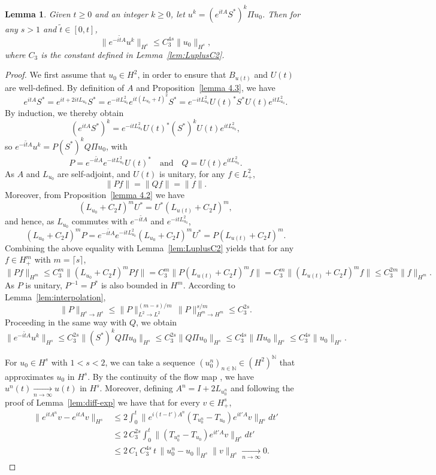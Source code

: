 \documentclass [11pt] {article}
\newtheorem{lem}[thm]{Lemma}
\begin{document}
\begin{lem}
\label{lem:Hs-bound}
Given $t\geq 0$ and an integer $k\geq 0$, let $u^k=(e^{itA}S^*)^k \Pi u_0$. Then for any $s>1$ and $\tilde t\in [0,t]$,
\[
\|e^{-i\tilde t A}u^k\|_{H^s} \leq C_3^{4s}\|u_0\|_{H^s},
\]
where $C_3$ is the constant defined in Lemma~\ref{lem:LuplusC2}.
\end{lem}
\begin{proof}
We first assume that $u_0\in H^2$, in order to ensure that $B_{u(t)}$ and $U(t)$ are well-defined.
By definition of $A$ and Proposition~\ref{lemma 4.3}, we have
\[
e^{itA}S^*=e^{it+2itL_{u_0}}S^*= e^{-i t L_{u_0}^2} e^{i t\left(L_{u_0}+I\right)^2} S^* = e^{-i t L_{u_0}^2} U(t)^*S^*U(t) e^{i t L_{u_0}^2}.
\]
By induction, we thereby obtain
\[
(e^{itA}S^*)^k=e^{-i t L_{u_0}^2} U(t)^* (S^*)^k U(t) e^{i t L_{u_0}^2},
\]
so $e^{-i\tilde tA}u^k=P(S^*)^kQ\Pi u_0$, with
\[
P=e^{-i\tilde t A}e^{-i t L_{u_0}^2} U(t)^*\quad\text{and}\quad Q=U(t) e^{i t L_{u_0}^2}.
\]
As $A$ and $L_{u_0}$ are self-adjoint, and $U(t)$ is unitary, for any $f\in L^2_+$,
\[
\|Pf\|=\|Qf\|=\|f\|.
\]
Moreover, 
from Proposition~\ref{lemma 4.2} we have
\[
(L_{u_0}+C_2I)^m U^{*} = U^{*}(L_{u(t)}+C_2I)^m,
\]
and hence, as $L_{u_0}$ commutes with $e^{-i\tilde t A}$ and $e^{-i t L_{u_0}^2}$,
\[
(L_{u_0}+C_2I)^mP=e^{-i\tilde t A}e^{-i t L_{u_0}^2}(L_{u_0}+C_2I)^m U^{*}=P(L_{u(t)}+C_2I)^m.
\]
Combining the above equality with Lemma~\ref{lem:LuplusC2} yields that
for any $f\in H^{m}_+$ with $m=\lceil s\rceil$,
\[
\|Pf\|_{H^m}\leq C_3^m\|(L_{u_0}+C_2I)^mPf\|=C_3^m\|P(L_{u(t)}+C_2I)^mf\|=C_3^m\|(L_{u(t)}+C_2I)^mf\|\leq C_3^{2m}\|f\|_{H^m}.
\]
As $P$ is unitary, $P^{-1}=P^*$ is also bounded in $H^m$. According to Lemma~\ref{lem:interpolation},
\[
\|P\|_{H^s\to H^s}\leq \|P\|_{L^2\to L^2}^{(m-s)/m}\,\|P\|_{H^m\to H^m}^{s/m}\leq C_3^{2s}.
\]
Proceeding in the same way with $Q$, we obtain
\[
\|e^{-i\tilde t A}u^k\|_{H^s}\leq C_3^{2s}\|(S^*)^kQ\Pi u_0\|_{H^s}\leq C_3^{2s}\|Q\Pi u_0\|_{H^s}\leq C_3^{4s}\|\Pi u_0\|_{H^s}\leq C_3^{4s}\|u_0\|_{H^s}.
\]

For $u_0 \in H^s$ with $1<s< 2$, we can take a sequence $(u_0^n)_{n\in\mathbb N} \in (H^2)^{\mathbb N}$ that approximates $u_0$ in $H^s$. By the continuity of the flow map \cite[Theorem 1.1]{Mo07}, we have  $u^n(t) \underset{n \rightarrow \infty}{\longrightarrow} u(t)$ in $H^s$. Moreover, defining $A^n=I+2L_{u_0^n}$ and following the proof of Lemma~\ref{lem:diff-exp} we have that for every $v \in H_{+}^s$,
\begin{align*}
\|e^{itA^n}v-e^{itA}v\|_{H^s}
& \leq 2\int_0^t\|e^{i(t-t')A^n}(T_{u_0^n}-T_{u_0})e^{it'A}v\|_{H^s}dt'\\
& \leq 2\,C_3^{2s} \int_0^t\|(T_{u_0^n}-T_{u_0})e^{it'A}v\|_{H^s}dt'\\ & \leq 2\,C_1\,C_3^{4s}\,t\, \|u_0^n-u_0\|_{H^s}\|v\|_{H^s} \underset{n \rightarrow \infty}{\longrightarrow} 0.
\end{align*}


\end{proof}
\end{document}
